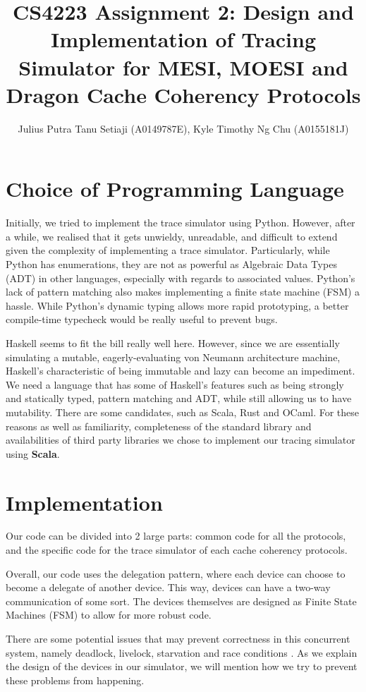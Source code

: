 \documentclass[nonacm,acmsmall,screen,11pt]{acmart}
\title{CS4223 Assignment 2: Design and Implementation of Tracing Simulator for MESI, MOESI and Dragon Cache Coherency Protocols}
\author{Julius Putra Tanu Setiaji (A0149787E), Kyle Timothy Ng Chu (A0155181J)}
\begin{document}
\maketitle

\section{Choice of Programming Language}
Initially, we tried to implement the trace simulator using Python.
However, after a while, we realised that it gets unwieldy, unreadable, and difficult to extend given the complexity of implementing a trace simulator.
Particularly, while Python has enumerations, they are not as powerful as Algebraic Data Types (ADT) in other languages, especially with regards to associated values.
Python's lack of pattern matching also makes implementing a finite state machine (FSM) a hassle.
While Python's dynamic typing allows more rapid prototyping, a better compile-time typecheck would be really useful to prevent bugs.

Haskell seems to fit the bill really well here.
However, since we are essentially simulating a mutable, eagerly-evaluating von Neumann architecture machine, Haskell's characteristic of being immutable and lazy can become an impediment.
We need a language that has some of Haskell's features such as being strongly and statically typed, pattern matching and ADT, while still allowing us to have mutability.
There are some candidates, such as Scala, Rust and OCaml.
For these reasons as well as familiarity, completeness of the standard library and availabilities of third party libraries we chose to implement our tracing simulator using \textbf{Scala}.

\section{Implementation}
Our code can be divided into 2 large parts: common code for all the protocols, and the specific code for the trace simulator of each cache coherency protocols.

Overall, our code uses the delegation pattern, where each device can choose to become a delegate of another device.
This way, devices can have a two-way communication of some sort.
The devices themselves are designed as Finite State Machines (FSM) to allow for more robust code.

There are some potential issues that may prevent correctness in this concurrent system, namely deadlock, livelock, starvation and race conditions \cite{Culler:1998:PCA:2821564}.
As we explain the design of the devices in our simulator, we will mention how we try to prevent these problems from happening.
\end{document}
